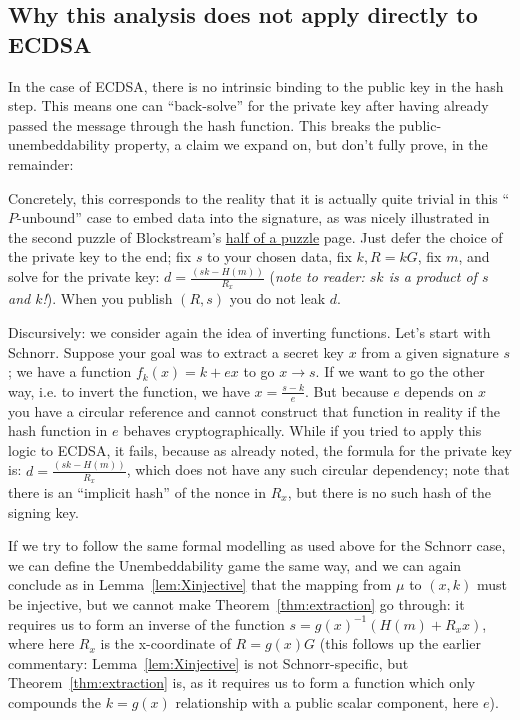 \documentclass[10pt,a4paper]{article}
\theoremstyle{definition}   %
\theoremstyle{remark}       %
\begin{document}
\subsection{Why this analysis does not apply directly to ECDSA}

In the case of ECDSA, there is no intrinsic binding to the public key in the hash step. This means one can ``back-solve'' for the private key after having already passed the message through the hash function. This breaks the public-unembeddability property, a claim we expand on, but don't fully prove, in the remainder:

\vskip 0.2in

Concretely, this corresponds to the reality that it is actually quite trivial in this ``$P$-unbound'' case to embed data into the signature, as was nicely illustrated in the second puzzle of Blockstream's \href{https://blockstream.com/puzzle/}{half of a puzzle} page. Just defer the choice of the private key to the end; fix $s$ to your chosen data, fix $k, R=kG$, fix $m$, and solve for the private key: $d = \frac{(sk - H(m))}{R_x}$ (\emph{note to reader: $sk$ is a product of $s$ and $k$!}). When you publish $(R, s)$ you do not leak $d$.

\vskip 0.2in

Discursively: we consider again the idea of inverting functions. Let's start with Schnorr. Suppose your goal was to extract a secret key $x$ from a given signature $s$; we have a function $f_k(x) = k + ex$ to go $x \rightarrow s$. If we want to go the other way, i.e. to invert the function, we have $x = \frac{s - k}{e}$. But because $e$ depends on $x$ you have a circular reference and cannot construct that function in reality if the hash function in $e$ behaves cryptographically. While if you tried to apply this logic to ECDSA, it fails, because as already noted, the formula for the private key is: $d = \frac{(sk - H(m))}{R_x}$, which does not have any such circular dependency; note that there is an ``implicit hash'' of the nonce in $R_x$, but there is no such hash of the signing key.

\vskip 0.2in

If we try to follow the same formal modelling as used above for the Schnorr case, we can define the Unembeddability game the same way, and we can again conclude as in Lemma~\ref{lem:Xinjective} that the mapping from $\mu$ to $(x, k)$ must be injective, but we cannot make Theorem~\ref{thm:extraction} go through: it requires us to form an inverse of the function $s = g(x)^{-1}\left(H(m) + R_xx\right)$, where here $R_x$ is the x-coordinate of $R = g(x)G$ (this follows up the earlier commentary: Lemma~\ref{lem:Xinjective} is not Schnorr-specific, but Theorem~\ref{thm:extraction} is, as it requires us to form a function which only compounds the $k=g(x)$ relationship with a public scalar component, here $e$).
\end{document}
